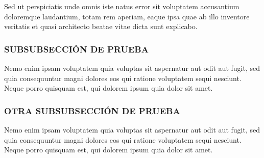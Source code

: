 Sed ut perspiciatis unde omnis iste natus error sit voluptatem accusantium doloremque laudantium, totam rem aperiam, eaque ipsa quae ab illo inventore veritatis et quasi architecto beatae vitae dicta sunt explicabo.

\subsubsection{SUBSUBSECCIÓN DE PRUEBA}

Nemo enim ipsam voluptatem quia voluptas sit aspernatur aut odit aut fugit, sed quia consequuntur magni dolores eos qui ratione voluptatem sequi nesciunt. Neque porro quisquam est, qui dolorem ipsum quia dolor sit amet.

\subsubsection{OTRA SUBSUBSECCIÓN DE PRUEBA}

Nemo enim ipsam voluptatem quia voluptas sit aspernatur aut odit aut fugit, sed quia consequuntur magni dolores eos qui ratione voluptatem sequi nesciunt. Neque porro quisquam est, qui dolorem ipsum quia dolor sit amet.
